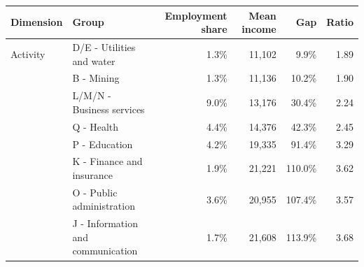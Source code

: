 \begin{tabular}{lp{}rrrr}
\toprule
    Dimension & Group & Employment share & Mean income & Gap & Ratio \\
    \midrule
Activity & D/E - Utilities and water & 1.3\% & 11,102 & 9.9\% & 1.89 \\
& B - Mining & 1.3\% & 11,136 & 10.2\% & 1.90 \\
& L/M/N - Business services & 9.0\% & 13,176 & 30.4\% & 2.24 \\
& Q - Health & 4.4\% & 14,376 & 42.3\% & 2.45 \\
& P - Education & 4.2\% & 19,335 & 91.4\% & 3.29 \\
& K - Finance and insurance & 1.9\% & 21,221 & 110.0\% & 3.62 \\
& O - Public administration & 3.6\% & 20,955 & 107.4\% & 3.57 \\
& J - Information and communication & 1.7\% & 21,608 & 113.9\% & 3.68\\
\bottomrule\end{tabular}
